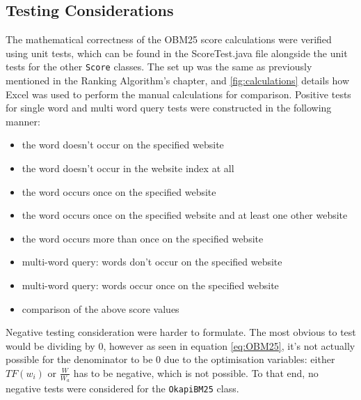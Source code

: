 \subsection{Testing Considerations}
The mathematical correctness of the OBM25 score calculations were verified using unit tests, which can be found in the ScoreTest.java file alongside the unit tests for the other {\tt Score} classes.
The set up was the same as previously mentioned in the Ranking Algorithm's chapter, and \ref{fig:calculations} details how Excel was used to perform the manual calculations for comparison.
Positive tests for single word and multi word query tests were constructed in the following manner:
\begin{itemize}
    \item the word doesn't occur on the specified website
    \item the word doesn't occur in the website index at all
    \item the word occurs once on the specified website
    \item the word occurs once on the specified website and at least one other website
    \item the word occurs more than once on the specified website
    \item multi-word query: words don't occur on the specified website
    \item multi-word query: words occur once on the specified website
    \item comparison of the above score values
\end{itemize}

Negative testing consideration were harder to formulate.
The most obvious to test would be dividing by 0, however as seen in equation \ref{eq:OBM25}, it's not actually possible for the denominator to be 0 due to the optimisation variables: either $TF(w_i)$ or $\frac{W}{W_a}$ has to be negative, which is not possible.
To that end, no negative tests were considered for the {\tt OkapiBM25} class.

